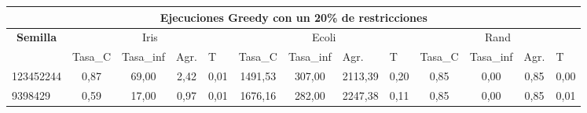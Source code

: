 \documentclass[12pt, spanish]{article}
\begin{document}
\begin{table}[H]
\small

\begin{adjustwidth}{-1cm}{-1cm}%

\begin{tabular}{|l|c|c|c|c|c|c|c|c|c|c|c|c|}
\hline
\multicolumn{13}{|c|}{\textbf{Ejecuciones Greedy con un 20\% de restricciones}}                                                                                                                                                                                                                                                                                                                                        \\ \hline
\multicolumn{1}{|c|}{\multirow{2}{*}{\textbf{Semilla}}} & \multicolumn{4}{c|}{Iris}                                                                                          & \multicolumn{4}{c|}{Ecoli}                                                                                         & \multicolumn{4}{c|}{Rand}                                                                                          \\ \cline{2-13} 
\multicolumn{1}{|c|}{}                                  & \multicolumn{1}{l|}{Tasa\_C} & \multicolumn{1}{l|}{Tasa\_inf} & \multicolumn{1}{l|}{Agr.} & \multicolumn{1}{l|}{T} & \multicolumn{1}{l|}{Tasa\_C} & \multicolumn{1}{l|}{Tasa\_inf} & \multicolumn{1}{l|}{Agr.} & \multicolumn{1}{l|}{T} & \multicolumn{1}{l|}{Tasa\_C} & \multicolumn{1}{l|}{Tasa\_inf} & \multicolumn{1}{l|}{Agr.} & \multicolumn{1}{l|}{T} \\ \hline
123452244                                               & 0,87                         & 69,00                          & 2,42                      & 0,01                   & 1491,53                      & 307,00                         & 2113,39                   & 0,20                   & 0,85                         & 0,00                           & 0,85                      & 0,00                   \\ \hline
9398429                                                 & 0,59                         & 17,00                          & 0,97                      & 0,01                   & 1676,16                      & 282,00                         & 2247,38                   & 0,11                   & 0,85                         & 0,00                           & 0,85                      & 0,01                   \\ \hline

\end{tabular}
\end{adjustwidth}
\end{table}
\end{document}
